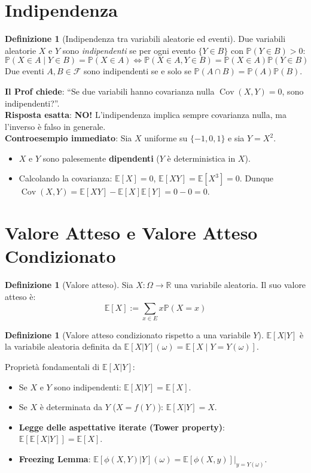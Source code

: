 \documentclass[11pt, a4paper]{report}
\theoremstyle{plain}
\theoremstyle{definition}
\newtheorem{definition}[theorem]{Definizione}
\theoremstyle{remark}
\newcommand{\PP}{\mathbb{P}}
\newcommand{\E}{\mathbb{E}}
\newcommand{\F}{\mathcal{F}}
\newcommand{\R}{\mathbb{R}}
\newcommand{\1}{\mathbf{1}}
\newcommand{\Cov}{\operatorname{Cov}}
\begin{document}
\section{Indipendenza}

\begin{definition}[Indipendenza tra variabili aleatorie ed eventi]
Due variabili aleatorie $X$ e $Y$ sono \emph{indipendenti} se per ogni evento $\{Y \in B\}$ con $\PP(Y \in B)>0$:
\[ \PP(X \in A \mid Y \in B) = \PP(X \in A) \iff \PP(X \in A, Y \in B) = \PP(X \in A)\PP(Y \in B) \]
Due eventi $A, B \in \F$ sono indipendenti se e solo se $\PP(A \cap B) = \PP(A)\PP(B)$.
\end{definition}

\begin{domandaprof}
\textbf{Il Prof chiede}: ``Se due variabili hanno covarianza nulla $\Cov(X,Y)=0$, sono indipendenti?''.\\
\textbf{Risposta esatta}: \textbf{NO!} L'indipendenza implica sempre covarianza nulla, ma l'inverso è falso in generale.\\
\textbf{Controesempio immediato}: Sia $X$ uniforme su $\{-1, 0, 1\}$ e sia $Y = X^2$.
\begin{itemize}
    \item $X$ e $Y$ sono palesemente \textbf{dipendenti} ($Y$ è deterministica in $X$).
    \item Calcolando la covarianza: $\E[X] = 0$, $\E[X Y] = \E[X^3] = 0$. Dunque $\Cov(X,Y) = \E[XY] - \E[X]\E[Y] = 0 - 0 = 0$.
\end{itemize}
\end{domandaprof}

\section{Valore Atteso e Valore Atteso Condizionato}

\begin{definition}[Valore atteso]
Sia $X : \Omega \to \R$ una variabile aleatoria. Il suo valore atteso è:
\[ \E[X] := \sum_{x \in E} x \PP(X = x) \]
\end{definition}

\begin{definition}[Valore atteso condizionato rispetto a una variabile $Y$]
$\E[X|Y]$ è la variabile aleatoria definita da $\E[X|Y](\omega) = \E[X \mid Y = Y(\omega)]$.
\end{definition}

Proprietà fondamentali di $\E[X|Y]$:
\begin{itemize}
    \item Se $X$ e $Y$ sono indipendenti: $\E[X|Y] = \E[X]$.
    \item Se $X$ è determinata da $Y$ ($X = f(Y)$): $\E[X|Y] = X$.
    \item \textbf{Legge delle aspettative iterate (Tower property)}: $\E[\E[X|Y]] = \E[X]$.
    \item \textbf{Freezing Lemma}: $\E[\phi(X,Y)|Y](\omega) = \E[\phi(X, y)]\big|_{y=Y(\omega)}$.
\end{itemize}
\end{document}
